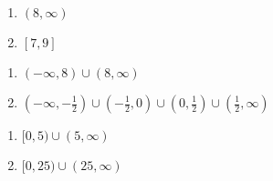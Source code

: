 \begin{multicols}{2}
\begin{enumerate}
\setcounter{enumi}{\value{HW}}

\item $(8, \infty)$

\item $[7, 9]$

\setcounter{HW}{\value{enumi}}
\end{enumerate}
\end{multicols}

\begin{multicols}{2}
\begin{enumerate}
\setcounter{enumi}{\value{HW}}

\item $(-\infty, 8) \cup (8, \infty)$

\item $\left( -\infty, -\frac{1}{2} \right) \cup \left( -\frac{1}{2}, 0 \right) \cup \left(0, \frac{1}{2} \right) \cup \left( \frac{1}{2}, \infty\right)$


\setcounter{HW}{\value{enumi}}
\end{enumerate}
\end{multicols}

\begin{multicols}{2}
\begin{enumerate}
\setcounter{enumi}{\value{HW}}

\item $[0, 5) \cup (5,\infty)$

\item $[0, 25) \cup (25, \infty)$

\setcounter{HW}{\value{enumi}}
\end{enumerate}
\end{multicols}


